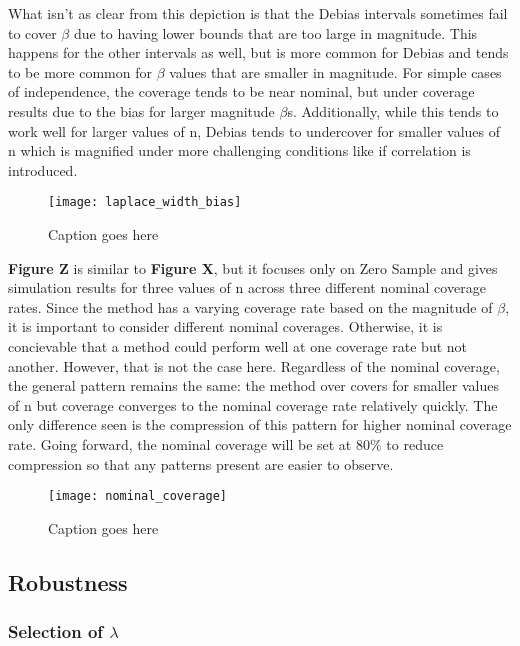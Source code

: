 What isn't as clear from this depiction is that the Debias intervals sometimes fail to cover $\beta$ due to having lower bounds that are too large in magnitude. This happens for the other intervals as well, but is more common for Debias and tends to be more common for $\beta$ values that are smaller in magnitude. For simple cases of independence, the coverage tends to be near nominal, but under coverage results due to the bias for larger magnitude $\beta$s. Additionally, while this tends to work well for larger values of n, Debias tends to undercover for smaller values of n which is magnified under more challenging conditions like if correlation is introduced.



\begin{figure}
  \texttt{[image: laplace\_width\_bias]}
  \caption{\label{Fig:laplace_width_bias} Caption goes here}
\end{figure}

\textbf{Figure Z} is similar to \textbf{Figure X}, but it focuses only on Zero Sample and gives simulation results for three values of n across three different nominal coverage rates. Since the method has a varying coverage rate based on the magnitude of $\beta$, it is important to consider different nominal coverages. Otherwise, it is concievable that a method could perform well at one coverage rate but not another. However, that is not the case here. Regardless of the nominal coverage, the general pattern remains the same: the method over covers for smaller values of n but coverage converges to the nominal coverage rate relatively quickly. The only difference seen is the compression of this pattern for higher nominal coverage rate. Going forward, the nominal coverage will be set at $80\%$ to reduce compression so that any patterns present are easier to observe.


\begin{figure}
  \texttt{[image: nominal\_coverage]}
  \caption{\label{Fig:nominal_coverage} Caption goes here}
\end{figure}

\subsection{Robustness}

\subsubsection{Selection of \texorpdfstring{$\lambda$}{lambda}}

